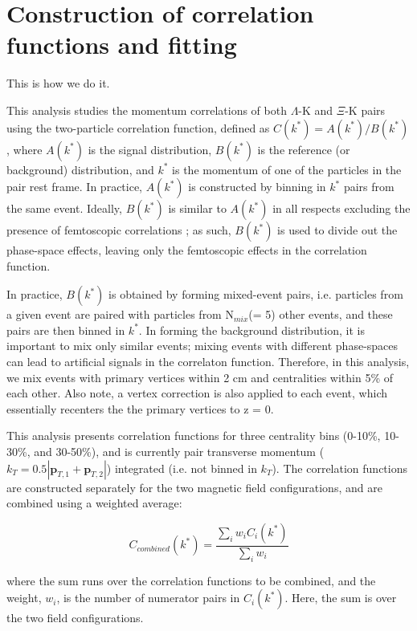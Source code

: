 \documentclass[ALICE,manyauthors]{cernphprep}
\begin{document}
\section{Construction of correlation functions and fitting}
\label{sec:CfConstructionAndFitting}
This is how we do it.



This analysis studies the momentum correlations of both $\Lambda$-K and $\Xi$-K pairs using the two-particle correlation function, defined as $C(k^{*}) = A(k^{*})/B(k^{*})$, where $A(k^{*})$ is the signal distribution, $B(k^{*})$ is the reference (or background) distribution, and $k^{*}$ is the momentum of one of the particles in the pair rest frame.
In practice, $A(k^{*})$ is constructed by binning in $k^{*}$ pairs from the same event.
Ideally, $B(k^{*})$ is similar to $A(k^{*})$ in all respects excluding the presence of femtoscopic correlations \cite{Lisa:2005dd}; as such, $B(k^{*})$ is used to divide out the phase-space effects, leaving only the femtoscopic effects in the correlation function. 

In practice, $B(k^{*})$ is obtained by forming mixed-event pairs, i.e. particles from a given event are paired with particles from N$_{mix}$(= 5) other events, and these pairs are then binned in $k^{*}$.
In forming the background distribution, it is important to mix only similar events; mixing events with different phase-spaces can lead to artificial signals in the correlaton function.
Therefore, in this analysis, we mix events with primary vertices within 2 cm and centralities within 5\% of each other.
Also note, a vertex correction is also applied to each event, which essentially recenters the the primary vertices to z = 0.

This analysis presents correlation functions for three centrality bins (0-10\%, 10-30\%, and 30-50\%), and is currently pair transverse momentum ($k_{T} = 0.5|\mathbf{p}_{T,1}+\mathbf{p}_{T,2}|$) integrated (i.e. not binned in $k_{T}$).  
The correlation functions are constructed separately for the two magnetic field configurations, and are combined using a weighted average:

\begin{equation}
  C_{combined}(k^{*}) = \frac{\sum\limits_{i}w_{i}C_{i}(k^{*})}{\sum\limits_{i}w_{i}} 
\label{eqn:CombineCfs}
\end{equation}

where the sum runs over the correlation functions to be combined, and the weight, $w_{i}$, is the number of numerator pairs in $C_{i}(k^{*})$.
Here, the sum is over the two field configurations.
\end{document}
